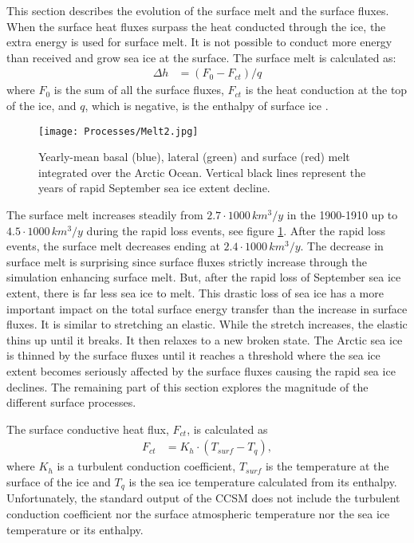 This section describes the evolution of the surface melt and the surface fluxes. When the surface heat fluxes surpass the heat conducted through the ice, the extra energy is used for surface melt. It is not possible to conduct more energy than received and grow sea ice at the surface. The surface melt is calculated as:
\begin{align}
\Delta h &= (F_{0} - F_{ct})/q \label{eqm1}
\end{align}
where $F_{0}$ is the sum of all the surface fluxes, $F_{ct}$ is the heat conduction at the top of the ice, and $q$, which is negative, is the enthalpy of surface ice \citep{Hunke:2008ly}. 
\begin{figure}[h]
\center
\noindent\texttt{[image: Processes/Melt2.jpg]}
\caption{Yearly-mean basal (blue), lateral (green) and surface (red) melt integrated over the Arctic Ocean. Vertical black lines represent the years of rapid September sea ice extent decline.}
\label{melt}
\end{figure}
The surface melt increases steadily from $2.7 \cdot 1000 \, km^3/y$ in the 1900-1910 up to $4.5 \cdot 1000 \, km^3/y$ during the rapid loss events, see figure \ref{melt}. After the rapid loss events, the surface melt decreases ending at $2.4 \cdot 1000 \, km^3/y$.   The decrease in surface melt is surprising since surface fluxes strictly increase through the simulation enhancing surface melt. But, after the rapid loss of September sea ice extent, there is far less sea ice to melt. This drastic loss of sea ice has a more important impact on the total surface energy transfer than the increase in surface fluxes. It is similar to stretching an elastic. While the stretch increases, the elastic thins up until it breaks. It then relaxes to a new broken state. The Arctic sea ice is thinned by the surface fluxes until it reaches a threshold where the sea ice extent becomes seriously affected by the surface fluxes causing the rapid sea ice declines. The remaining part of this section explores the magnitude of the different surface processes. 

The surface conductive heat flux, $F_{ct}$, is calculated as 
\begin{align}
F_{ct} &= K_h \cdot (T_{surf} - T_q),
\end{align}
where $K_h$ is a turbulent conduction coefficient, $T_{surf}$ is the temperature at the surface of the ice and $T_q$ is the sea ice temperature calculated from its enthalpy. Unfortunately, the standard output of the CCSM does not include the turbulent conduction coefficient nor the surface atmospheric temperature nor the sea ice temperature or its enthalpy. 

